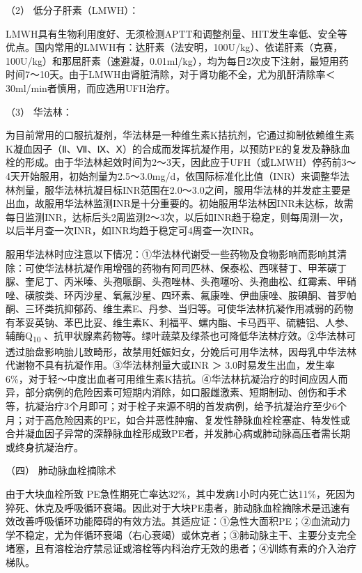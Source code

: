 \hypertarget{text00278.htmlux5cux23CHP9-8-3-1-3-3-2}{}
（2） 低分子肝素（LMWH）：

LMWH具有生物利用度好、无须检测APTT和调整剂量、HIT发生率低、安全等优点。国内常用的LMWH有：达肝素（法安明，100U/kg）、依诺肝素（克赛，100U/kg）和那屈肝素（速避凝，0.01ml/kg），均为每日2次皮下注射，最短用药时间7～10天。由于LMWH由肾脏清除，对于肾功能不全，尤为肌酐清除率＜
30ml/min者慎用，而应选用UFH治疗。

\hypertarget{text00278.htmlux5cux23CHP9-8-3-1-3-3-3}{}
（3） 华法林：

为目前常用的口服抗凝剂，华法林是一种维生素K拮抗剂，它通过抑制依赖维生素K凝血因子（Ⅱ、Ⅶ、Ⅸ、Ⅹ）的合成而发挥抗凝作用，以预防PE的复发及静脉血栓的形成。由于华法林起效时间为2～3天，因此应于UFH（或LMWH）停药前3～4天开始服用，初始剂量为2.5～3.0mg/d，依国际标准化比值（INR）来调整华法林剂量，服华法林抗凝目标INR范围在2.0～3.0之间，服用华法林的并发症主要是出血，故服用华法林监测INR是十分重要的。初始服用华法林因INR未达标，故需每日监测INR，达标后头2周监测2～3次，以后如INR趋于稳定，则每周测一次，以后半月查一次INR，如INR均趋于稳定可4周查一次INR。

服用华法林时应注意以下情况：①华法林代谢受一些药物及食物影响而影响其清除：可使华法林抗凝作用增强的药物有阿司匹林、保泰松、西咪替丁、甲苯磺丁脲、奎尼丁、丙米嗪、头孢哌酮、头孢唑林、头孢噻吩、头孢曲松、红霉素、甲硝唑、磺胺类、环丙沙星、氧氟沙星、四环素、氟康唑、伊曲康唑、胺碘酮、普罗帕酮、三环类抗抑郁药、维生素E、丹参、当归等。可使华法林抗凝作用减弱的药物有苯妥英钠、苯巴比妥、维生素K、利福平、螺内酯、卡马西平、硫糖铝、人参、辅酶Q\textsubscript{10}
、抗甲状腺素药物等。绿叶蔬菜及绿茶也可降低华法林疗效。②华法林可透过胎盘影响胎儿致畸形，故禁用妊娠妇女，分娩后可用华法林，因母乳中华法林代谢物不具有抗凝作用。③华法林剂量大或INR
＞
3.0时易发生出血，发生率6\%，对于轻～中度出血者可用维生素K拮抗。④华法林抗凝治疗的时间应因人而异，部分病例的危险因素可短期内消除，如口服雌激素、短期制动、创伤和手术等，抗凝治疗3个月即可；对于栓子来源不明的首发病例，给予抗凝治疗至少6个月；对于高危险因素的PE，如合并恶性肿瘤、复发性静脉血栓栓塞症、特发性或合并凝血因子异常的深静脉血栓形成致PE者，并发肺心病或肺动脉高压者需长期或终身抗凝治疗。

\hypertarget{text00278.htmlux5cux23CHP9-8-3-1-4}{}
（四） 肺动脉血栓摘除术

由于大块血栓所致
PE急性期死亡率达32\%，其中发病1小时内死亡达11\%，死因为猝死、休克及呼吸循环衰竭。因此对于大块PE患者，肺动脉血栓摘除术是迅速有效改善呼吸循环功能障碍的有效方法。其适应证：①急性大面积PE；②血流动力学不稳定，尤为伴循环衰竭（右心衰竭）或休克者；③肺动脉主干、主要分支完全堵塞，且有溶栓治疗禁忌证或溶栓等内科治疗无效的患者；④训练有素的介入治疗梯队。

